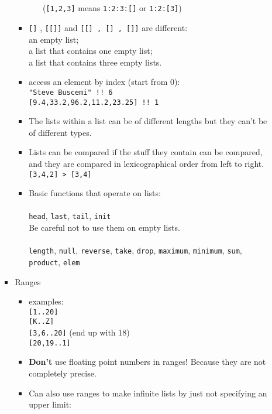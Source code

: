 \documentclass[a4paper,10pt]{article}
\begin{document}
\begin{enumerate}
\begin{enumerate}
\begin{itemize}
\begin{itemize}
\begin{itemize}
    \\\\(\texttt{[1,2,3]} means \texttt{1:2:3:[]} or \texttt{1:2:[3]})\\
   \end{itemize}
   \item \texttt{[]} , \texttt{[[]]} and \texttt{[[] , [] , []]} are different:
   \\an empty list;
   \\a list that contains one empty list;
   \\a list that contains three empty lists.
   \item access an element by index (start from 0):
   \\\texttt{"Steve Buscemi" !! 6}
   \\\texttt{[9.4,33.2,96.2,11.2,23.25] !! 1}
   \item The lists within a list can be of different lengths but they can't be of different types. 
   \item Lists can be compared if the stuff they contain can be compared, and they are compared in lexicographical order from left to right.
   \\\texttt{[3,4,2] > [3,4]}
   \item Basic functions that operate on lists:
   \\\\\texttt{head}, \texttt{last}, \texttt{tail}, \texttt{init}
   \\Be careful not to use them on empty lists. 
   \\\\\texttt{length}, \texttt{null}, \texttt{reverse}, \texttt{take}, \texttt{drop}, \texttt{maximum}, \texttt{minimum}, \texttt{sum}, \texttt{product}, \texttt{elem}\\
  \end{itemize}
  \item Ranges
  \begin{itemize}
   \item examples:
   \\\texttt{[1..20]}
   \\\texttt{[\textquotesingle K\textquotesingle ..\textquotesingle Z\textquotesingle ]}
   \\\texttt{[3,6..20]} (end up with 18)
   \\\texttt{[20,19..1]}
   \item \textbf{Don't} use floating point numbers in ranges! Because they are not completely precise.
   \item Can also use ranges to make infinite lists by just not specifying an upper limit:

\end{itemize}
\end{itemize}
\end{enumerate}
\end{enumerate}
\end{document}
